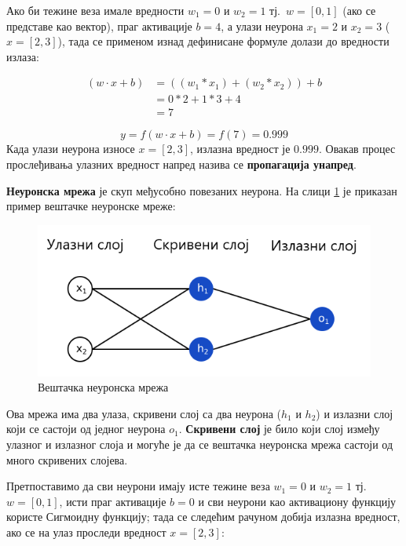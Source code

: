 \documentclass[12pt, а4paper]{article}
\begin{document}
Ако би тежине веза имале вредности $w_1 = 0$ и $w_2 = 1$ тј.\ $w=[0,1]$
(ако се представе као вектор),
праг активације $b = 4$, а
улази неурона $x_1 = 2$ и $x_2 = 3$ ($x=[2,3]$), тада се применом
изнад дефинисане формуле долази до вредности излаза:

\begin{equation}
\begin{split}
(w \cdot x + b) & = ((w_1 * x_1) + (w_2 * x_2)) + b \\
& = 0 * 2 + 1 * 3 + 4 \\
& = 7
\end{split}
\end{equation}

\begin{equation}
y = f(w \cdot x + b) = f(7) = 0.999
\end{equation}
Када улази неурона износе $x=[2,3]$, излазна вредност је $0.999$.
Овакав процес прослеђивања улазних вредност напред назива се \textbf{пропагација унапред}.

\textbf{Неуронска мрежа} је скуп међусобно повезаних неурона. На слици
\ref{fig:neuronskaMreza} је приказан пример вештачке неуронске мреже:

\begin{figure}[H]
  \centering
      \includegraphics[scale=0.6]{slike/neuronskaMreza}
  \caption{Вештачка неуронска мрежа}
  \label{fig:neuronskaMreza}
\end{figure}

Ова мрежа има два улаза, скривени слој са два неурона ($h_1$ и $h_2$) и
излазни слој који се састоји од једног неурона $o_1$. \textbf{Скривени слој}
је било који слој између улазног и излазног слоја и могуће је да се
вештачка неуронска мрежа састоји од много скривених слојева.

Претпоставимо да сви неурони имају исте тежине веза
$w_1 = 0$ и $w_2 = 1$ тј.\ $w = [0,1]$, исти праг активације $b = 0$ и
сви неурони као активациону функцију користе Сигмоидну функцију; тада
се следећим рачуном добија излазна вредност, ако се на улаз проследи
вредност $x=[2,3]$:
\end{document}
